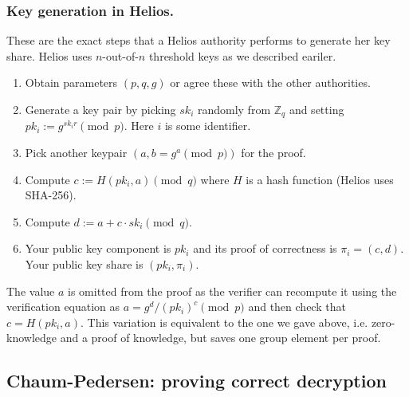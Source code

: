 \documentclass[envcountsame]{llncs}
\newenvironment{helios}{\begin{framed}
\vspace{-18pt}
\begin{figure}
\vspace{-12pt}\quad{\Huge \Sun}
\end{figure}}{\end{framed}}
\begin{document}
\begin{helios}
\subsubsection{Key generation in Helios.}
These are the exact steps that a Helios authority performs to generate her key
share. Helios uses $n$-out-of-$n$ threshold keys as we described eariler.
\vspace{12pt}

\noindent\hspace{6pt}\begin{minipage}{0.8\textwidth}
\begin{enumerate}
\item Obtain parameters $(p, q, g)$ or agree these with the other authorities.
\item Generate a key pair by picking $sk_i$ randomly from $\mathbb Z_q$ and
setting $pk_i := g^{sk_ir} \pmod{p}$. Here $i$ is some identifier.
\item Pick another keypair $(a, b = g^a \pmod{p})$ for the proof.
\item Compute $c := H(pk_i, a) \pmod{q}$ where $H$ is a hash function (Helios
uses SHA-256).
\item Compute $d := a + c \cdot sk_i \pmod{q}$.
\item Your public key component is $pk_i$ and its proof of
correctness is $\pi_i = (c, d)$. Your public key share is
$(pk_i, \pi_i)$.
\end{enumerate}
\end{minipage}\vspace{12pt}

The value $a$ is omitted from the proof as the verifier can recompute it using
the verification equation as $a = g^d/(pk_i)^c \pmod{p}$ and then check that $c
= H(pk_i, a)$. This variation is equivalent to the one we gave above, i.e.
zero-knowledge and a proof of knowledge, but saves one group element per proof.
\end{helios}

\subsection{Chaum-Pedersen: proving correct decryption}
\end{document}
